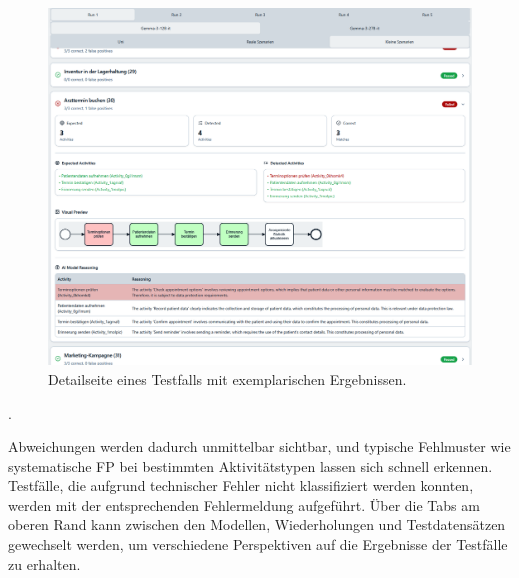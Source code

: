 \begin{figure}[h]
    \centering
    \includegraphics[width=\textwidth]{images/evaluation/evaluation-result-by-testcase_new}
    \caption{Detailseite eines Testfalls mit exemplarischen Ergebnissen.}
    \label{fig:evaluation-by-testcase}
\end{figure}.

Abweichungen werden dadurch unmittelbar sichtbar, und typische Fehlmuster wie systematische \ac{FP} bei bestimmten Aktivitätstypen lassen sich schnell erkennen. Testfälle, die aufgrund technischer Fehler nicht klassifiziert werden konnten, werden mit der entsprechenden Fehlermeldung aufgeführt. Über die Tabs am oberen Rand kann zwischen den Modellen, Wiederholungen und Testdatensätzen gewechselt werden, um verschiedene Perspektiven auf die Ergebnisse der Testfälle zu erhalten.
